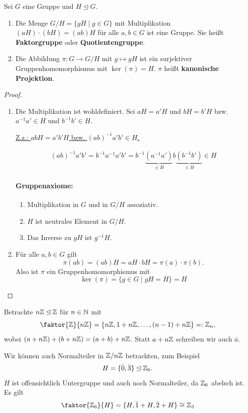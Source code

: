 \begin{satz}\label{satz1_16}
	Sei $G$ eine Gruppe und $H \unlhd G$.
	\begin{enumerate}[label=(\alph*)]
		\item Die Menge $G/H = \{gH \mid g \in G\}$ mit Multiplikation $(aH) \cdot (bH) = (ab)H$ für alle $a,b \in G$ ist eine Gruppe. Sie heißt \textbf{Faktorgruppe} oder \textbf{Quotientengruppe}.
		\item Die Abbildung $\pi \colon G \to G/H$ mit $g \mapsto gH$ ist ein surjektiver Gruppenhomomorphismus mit $\ker(\pi) = H$. $\pi $ heißt \textbf{kanonische Projektion}.
	\end{enumerate}
\end{satz}
\begin{proof}
	\begin{enumerate}[label=(\alph*)]
		\item Die Multiplikation ist wohldefiniert. Sei $aH = a'H$ und $bH = b'H$ bzw. $a^{-1}a' \in H$ und $b^{-1}b' \in H$. 
		
		\underline{Z.z.: $abH = a'b'H$ bzw. $(ab)^{-1} a'b' \in H$.}
		
		\begin{align*}
			(ab)^{-1} a'b' = b^{-1} a^{-1} a' b' = b^{-1} \underbrace{(a^{-1} a')}_{\in H} b \underbrace{(b^{-1} b')}_{\in H} \in H
		\end{align*}
		
		\paragraph{Gruppenaxiome:} 		
		\begin{enumerate}[label={\bfseries(G\arabic*)}]
			\item Multiplikation in $G$ und in $G/H$ assoziativ.
			\item $H$ ist neutrales Element in $G/H$.
			\item Das Inverse zu $gH$ ist $g^{-1}H$.
		\end{enumerate}
		
		\item Für alle $a,b \in G$ gilt 
		\[\pi(ab) = (ab)H = aH \cdot bH = \pi(a)\cdot\pi(b).\]
		Also ist $\pi$ ein Gruppenhomomorphismus mit
		\[\ker(\pi) = \{g \in G \mid gH = H\} = H\]
	\end{enumerate}
\end{proof}
\begin{beispiel}
	Betrachte $n\mathbb{Z} \unlhd \mathbb{Z}$ für $n \in \mathbb{N}$ mit
	\[\faktor{\Z}{n\Z} = \{n\Z, 1 + n\Z, \dots, (n-1) + n\Z\} =: \Z_n,\]
	wobei $(a + n\mathbb{Z}) + (b + n\mathbb{Z}) = (a + b) + n\mathbb{Z}$. Statt $a + n\mathbb{Z}$ schreiben wir auch $\bar{a}$.
	
	Wir können auch Normalteiler in $\mathbb{Z}/n\mathbb{Z}$ betrachten, zum Beispiel
	\[H = \{\bar{0}, \bar{3}\} \unlhd \mathbb{Z}_6.\]
	$H$ ist offensichtlich Untergruppe und auch noch Normalteiler, da $\mathbb{Z}_6$ abelsch ist. Es gilt
	\[\faktor{\Z_6}{H} = \{H, \bar{1} + H, \bar{2} + H\} \cong \Z_3\]
\end{beispiel}


